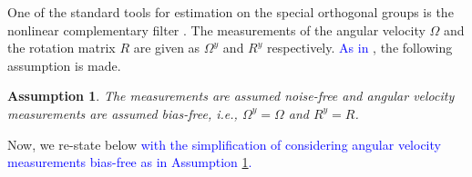 \documentclass{article}
\newcommand{\Omegay}{\Omega^y}
\newtheorem{assumption}{Assumption}
\newcommand{\textblue}[1]{\textcolor{blue}{#1}}
\begin{document}
One of the standard tools for estimation on the special orthogonal groups is the nonlinear complementary filter \cite{mahony_complementaryFilter}. The measurements of the angular velocity $\Omega$ and the rotation matrix $R$ are given as $\Omegay$ and $R^y$ respectively. \textblue{As in \cite{mahony_complementaryFilter}}, the following assumption is made. 
\begin{assumption} \label{ass:no_meas_noise}
    The measurements are assumed noise-free and angular velocity measurements are assumed bias-free, i.e., {$\Omegay=\Omega$ and $R^y = R$.}
\end{assumption}

Now, we re-state below \textblue{{\cite[Theorem 4.2]{mahony_complementaryFilter}}} \textblue{with the simplification of considering angular velocity measurements bias-free as in Assumption \ref{ass:no_meas_noise}.}
\end{document}
